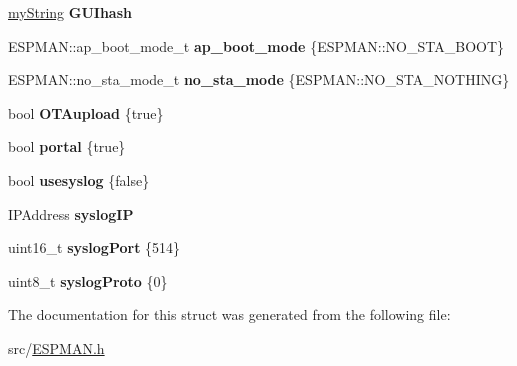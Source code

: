 \begin{DoxyCompactItemize}
\hyperlink{class_e_s_p_m_a_n_1_1my_string}{my\+String} {\bfseries G\+U\+Ihash}
\item 
\mbox{\label{struct_e_s_p_m_a_n_1_1settings__t_1_1_g_e_n__t_a640bdf5adde684226a66dd298ac7efe5}} 
E\+S\+P\+M\+A\+N\+::ap\+\_\+boot\+\_\+mode\+\_\+t {\bfseries ap\+\_\+boot\+\_\+mode} \{E\+S\+P\+M\+A\+N\+::\+N\+O\+\_\+\+S\+T\+A\+\_\+\+B\+O\+OT\}
\item 
\mbox{\label{struct_e_s_p_m_a_n_1_1settings__t_1_1_g_e_n__t_aa84d5a0388fc8068efa34d703deb329a}} 
E\+S\+P\+M\+A\+N\+::no\+\_\+sta\+\_\+mode\+\_\+t {\bfseries no\+\_\+sta\+\_\+mode} \{E\+S\+P\+M\+A\+N\+::\+N\+O\+\_\+\+S\+T\+A\+\_\+\+N\+O\+T\+H\+I\+NG\}
\item 
\mbox{\label{struct_e_s_p_m_a_n_1_1settings__t_1_1_g_e_n__t_afc2c324995308d27e5ca2aad1e65d8e6}} 
bool {\bfseries O\+T\+Aupload} \{true\}
\item 
\mbox{\label{struct_e_s_p_m_a_n_1_1settings__t_1_1_g_e_n__t_a48f40a1173569404329944f9ef57d951}} 
bool {\bfseries portal} \{true\}
\item 
\mbox{\label{struct_e_s_p_m_a_n_1_1settings__t_1_1_g_e_n__t_a352dd9cdbb9afecbf527047aa3786271}} 
bool {\bfseries usesyslog} \{false\}
\item 
\mbox{\label{struct_e_s_p_m_a_n_1_1settings__t_1_1_g_e_n__t_a55b73ec450eda7d09e6a9afcd25e230f}} 
I\+P\+Address {\bfseries syslog\+IP}
\item 
\mbox{\label{struct_e_s_p_m_a_n_1_1settings__t_1_1_g_e_n__t_ac0d72a4b8ed1054cb8a2325816cd82fa}} 
uint16\+\_\+t {\bfseries syslog\+Port} \{514\}
\item 
\mbox{\label{struct_e_s_p_m_a_n_1_1settings__t_1_1_g_e_n__t_a17722c66b84759e24f2a3c0ae0bfe223}} 
uint8\+\_\+t {\bfseries syslog\+Proto} \{0\}
\end{DoxyCompactItemize}


The documentation for this struct was generated from the following file\+:\begin{DoxyCompactItemize}
\item 
src/\hyperlink{_e_s_p_m_a_n_8h}{E\+S\+P\+M\+A\+N.\+h}\end{DoxyCompactItemize}
